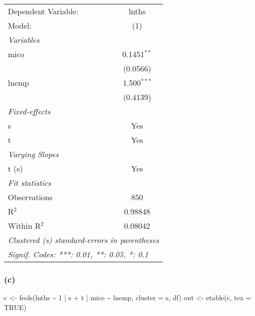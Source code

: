 \documentclass[
]{article}
\newenvironment{Shaded}{\begin{snugshade}}{\end{snugshade}}
\newcommand{\AttributeTok}[1]{\textcolor[rgb]{0.77,0.63,0.00}{#1}}
\newcommand{\ConstantTok}[1]{\textcolor[rgb]{0.00,0.00,0.00}{#1}}
\newcommand{\DecValTok}[1]{\textcolor[rgb]{0.00,0.00,0.81}{#1}}
\newcommand{\FunctionTok}[1]{\textcolor[rgb]{0.00,0.00,0.00}{#1}}
\newcommand{\NormalTok}[1]{#1}
\newcommand{\OtherTok}[1]{\textcolor[rgb]{0.56,0.35,0.01}{#1}}
\newcommand{\SpecialCharTok}[1]{\textcolor[rgb]{0.00,0.00,0.00}{#1}}
\newcommand{\StringTok}[1]{\textcolor[rgb]{0.31,0.60,0.02}{#1}}
\begin{document}
\begin{center}\begingroup\centering\begin{tabular}{lc}   \tabularnewline \midrule \midrule   Dependent Variable: & lnths\\     Model:              & (1)\\     \midrule   \emph{Variables}\\   mico                & 0.1451$^{**}$\\                          & (0.0566)\\      lnemp               & 1.500$^{***}$\\                          & (0.4139)\\      \midrule   \emph{Fixed-effects}\\   s                   & Yes\\     t                   & Yes\\     \midrule   \emph{Varying Slopes}\\   t (s)               & Yes\\     \midrule   \emph{Fit statistics}\\   Observations        & 850\\     R$^2$               & 0.98848\\     Within R$^2$        & 0.08042\\     \midrule \midrule   \multicolumn{2}{l}{\emph{Clustered (s) standard-errors in parentheses}}\\   \multicolumn{2}{l}{\emph{Signif. Codes: ***: 0.01, **: 0.05, *: 0.1}}\\\end{tabular}\par\endgroup\end{center}

\hypertarget{c-1}{%
\subsubsection{(c)}\label{c-1}}

\begin{Shaded}
\begin{Highlighting}[]
\NormalTok{c }\OtherTok{\textless{}{-}} \FunctionTok{feols}\NormalTok{(lnths }\SpecialCharTok{\textasciitilde{}} \DecValTok{1} \SpecialCharTok{|}\NormalTok{ s }\SpecialCharTok{+}\NormalTok{ t }\SpecialCharTok{|}\NormalTok{ mico }\SpecialCharTok{\textasciitilde{}}\NormalTok{ lnemp, }\AttributeTok{cluster =} \StringTok{\textquotesingle{}s\textquotesingle{}}\NormalTok{, df)}
\NormalTok{out }\OtherTok{\textless{}{-}} \FunctionTok{etable}\NormalTok{(c, }\AttributeTok{tex =} \ConstantTok{TRUE}\NormalTok{) }
\end{Highlighting}
\end{Shaded}
\end{document}
